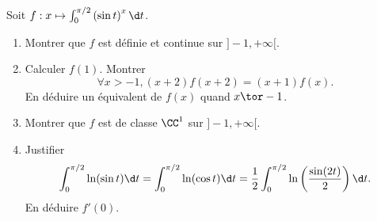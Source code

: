 \begin{enonce}
\begin{exercise}[ID={RMS 122-2 E1334 autres écoles PC},subtitle={},tags={}, difficulty={0}]
Soit $f:x\mapsto\int_0^{\pi/2} \left( \sin t \right)^x \d t$.
\begin{enumerate}
  \item Montrer que $f$ est définie et continue sur $]-1,+\infty[$.
  \item Calculer $f(1)$. Montrer
    \begin{equation*}
      \forall x>-1, (x+2)f(x+2)=(x+1)f(x).
    \end{equation*}
    En déduire un équivalent de $f(x)$ quand $x\tor -1$.
  \item Montrer que $f$ est de classe $\CC^1$ sur $]-1,+\infty[$.
  \item Justifier
    \begin{equation*}
      \int_0^{\pi/2}\ln(\sin t)\d t=\int_0^{\pi/2}\ln(\cos t)\d t=\frac12\int_0^{\pi/2}\ln\left( \frac{\sin(2t)}{2} \right)\d t.
    \end{equation*}
    En déduire $f'(0)$.
\end{enumerate}
\end{exercise}
\begin{solution}
\end{solution}
\end{enonce}
